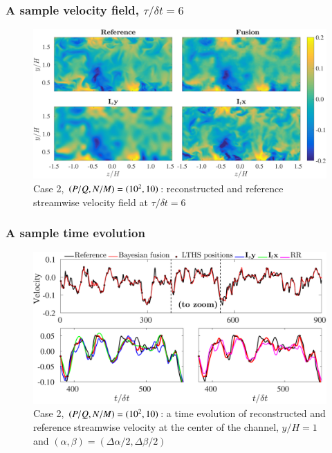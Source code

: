 \documentclass{beamer}
\begin{document}
\begin{frame}
\frametitle{A sample velocity field, $ \tau/\delta t = 6 $}
	\begin{figure}
		\includegraphics[width=\textwidth]{./figures/comparisons/channel/improper_outer_spacespacing_10_timespacing_10_subplots_t006.png}
		\caption*{Case 2, $ (P/Q,N/M) = (10^2,10) $: reconstructed and reference streamwise velocity field at $ \tau/\delta t  = 6$}
	\end{figure}				
\end{frame}

\begin{frame}
\frametitle{A sample time evolution}
	\begin{figure}
		\includegraphics[width=\textwidth]{./figures/comparisons/channel/improper_point_spacespacing_10_timespacing_10_yid129_zid149.eps}
		\caption*{Case 2, $ (P/Q,N/M) = (10^2,10) $: a time evolution of reconstructed and reference streamwise velocity at the center of the channel, $ y/H=1 $ and $ (\alpha,\beta) = (\Delta \alpha/2,\Delta \beta/2)$}
	\end{figure}
\end{frame}
\end{document}
